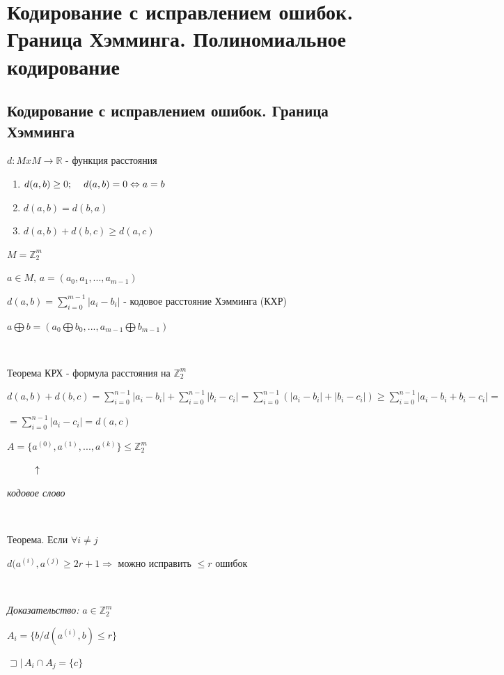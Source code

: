 \documentclass[12pt]{article}
\begin{document}
\section{Кодирование с исправлением ошибок. Граница Хэмминга. Полиномиальное кодирование}
\subsection{Кодирование с исправлением ошибок. Граница Хэмминга}
$d:MxM \rightarrow \mathbb{R}$ - функция расстояния
\begin{enumerate}
    \item $d(a,b) \geq 0; \hspace{4 mm} d(a,b) = 0 \Leftrightarrow a = b$
    \item $d(a,b) = d(b,a)$
    \item $d(a,b) + d(b,c) \geq d(a,c)$
\end{enumerate}\par
$M = \mathbb{Z}_2^m$\par
$a \in M, \,a = (a_0, a_1, ..., a_{m-1})$\par
$d(a,b) = \sum\limits_{i=0}^{m-1} |a_i - b_i|$ - кодовое расстояние Хэмминга (КХР)\par
$a \bigoplus b = (a_0 \bigoplus b_0, ... , a_{m-1} \bigoplus b_{m-1})$\par
$ $\par
Теорема КРХ - формула расстояния на $\mathbb{Z}_2^m$\par
$d(a,b)+d(b,c) = \sum\limits_{i=0}^{n-1}|a_i - b_i|+\sum\limits_{i=0}^{n-1}|b_i - c_i|=\sum\limits_{i=0}^{n-1}(|a_i - b_i|+|b_i - c_i|) \geq \sum\limits_{i=0}^{n-1}|a_i - b_i + b_i - c_i| =$\par
$ =\sum\limits_{i=0}^{n-1}|a_i - c_i| = d(a,c)$\par
$A=\{a^{(0)}, a^{(1)}, ... , a^{(k)}\} \leq \mathbb{Z}_2^m$\par
$\hspace{1 cm} \uparrow$\par
\textit{кодовое слово}\par
$ $\par
Теорема. Если $\forall i \neq j$\par
$d(a^{(i)},a^{(j)} \geq 2r+1 \Rightarrow$ можно исправить $\leq r$ ошибок \par
$ $\par
\textit{Доказательство:} $a \in \mathbb{Z}_2^m$\par
$A_i = \{ b / d(a^{(i)}, b) \leq r \}$\par
$\sqsupset | \, A_i \cap A_j = \{ c \}$\par
\end{document}
